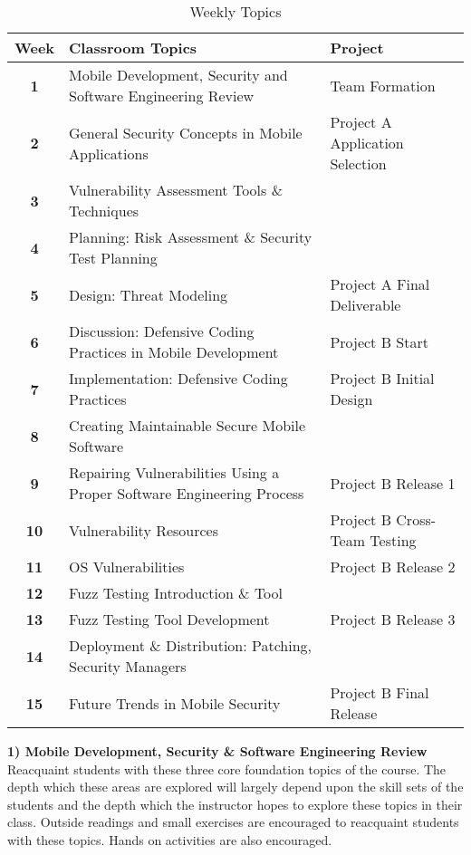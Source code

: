 \documentclass{sig-alternate}
\begin{document}
\begin{table*}[t]
  \centering
  \caption{Weekly Topics}
     \begin{tabular}{ c | l | l }
 \bfseries Week & \bfseries Classroom Topics & \bfseries Project  \\ \hline \hline
	\bfseries 1 & Mobile Development, Security and Software Engineering Review & Team Formation \\ \hline
	\bfseries 2 & General Security Concepts in Mobile Applications & Project A  Application Selection \\ \hline
	\bfseries 3 & Vulnerability Assessment Tools \& Techniques &  \\ \hline
	\bfseries 4 & Planning: Risk Assessment \& Security Test Planning &  \\ \hline
	\bfseries 5 & Design: Threat Modeling & Project A Final Deliverable \\ \hline
	\bfseries 6 & Discussion: Defensive Coding Practices in Mobile Development & Project B Start  \\ \hline
	\bfseries 7 & Implementation: Defensive Coding Practices &  Project B Initial Design\\ \hline	
	\bfseries 8 & Creating Maintainable Secure Mobile Software &  \\ \hline
	\bfseries 9 & Repairing Vulnerabilities Using a Proper Software Engineering Process & Project B Release 1  \\ \hline
	\bfseries 10 & Vulnerability Resources & Project B Cross-Team Testing \\ \hline
	\bfseries 11 & OS Vulnerabilities & Project B Release 2 \\ \hline
	\bfseries 12 & Fuzz Testing Introduction \& Tool &  \\ \hline
	\bfseries 13 & Fuzz Testing Tool Development &  Project B Release 3 \\ \hline
	\bfseries 14 & Deployment \& Distribution: Patching, Security Managers &  \\ \hline
	\bfseries 15 & Future Trends in Mobile Security & Project B Final Release \\
  \end{tabular}
  \label{table:weeklytopics}

\end{table*}

\textbf{1) Mobile Development, Security \& Software Engineering Review}\\
Reacquaint students with these three core foundation topics of the course. The depth which these areas are explored will largely depend upon the skill sets of the students and the depth which the instructor hopes to explore these topics in their class. Outside readings and small exercises are encouraged to reacquaint students with these topics. Hands on activities are also encouraged. \\
\end{document}
